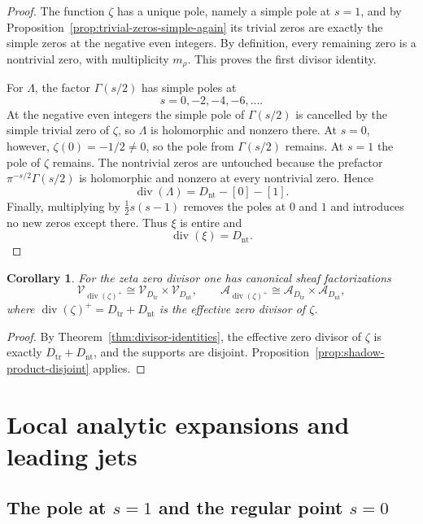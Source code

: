 \documentclass[11pt,a4paper]{article}
\newtheorem{corollary}[theorem]{Corollary}
\theoremstyle{definition}
\theoremstyle{remark}
\newcommand{\cV}{\mathcal V}
\newcommand{\cA}{\mathcal A}
\newcommand{\divv}{\operatorname{div}}
\begin{document}
\begin{proof}
The function $\zeta$ has a unique pole, namely a simple pole at $s=1$, and by Proposition~\ref{prop:trivial-zeros-simple-again} its trivial zeros are exactly the simple zeros at the negative even integers.  By definition, every remaining zero is a nontrivial zero, with multiplicity $m_\rho$.  This proves the first divisor identity.

For $\Lambda$, the factor $\Gamma(s/2)$ has simple poles at
\[
s=0,-2,-4,-6,\dots.
\]
At the negative even integers the simple pole of $\Gamma(s/2)$ is cancelled by the simple trivial zero of $\zeta$, so $\Lambda$ is holomorphic and nonzero there.  At $s=0$, however, $\zeta(0)=-1/2\neq 0$, so the pole from $\Gamma(s/2)$ remains.  At $s=1$ the pole of $\zeta$ remains.  The nontrivial zeros are untouched because the prefactor $\pi^{-s/2}\Gamma(s/2)$ is holomorphic and nonzero at every nontrivial zero.  Hence
\[
\divv(\Lambda)=D_{\mathrm{nt}}-[0]-[1].
\]
Finally, multiplying by $\frac12 s(s-1)$ removes the poles at $0$ and $1$ and introduces no new zeros except there.  Thus $\xi$ is entire and
\[
\divv(\xi)=D_{\mathrm{nt}}.
\]
\end{proof}

\begin{corollary}\label{cor:shadow-zeta-splits}
For the zeta zero divisor one has canonical sheaf factorizations
\[
\cV_{\divv(\zeta)^+}\cong \cV_{D_{\mathrm{tr}}}\times \cV_{D_{\mathrm{nt}}},
\qquad
\cA_{\divv(\zeta)^+}\cong \cA_{D_{\mathrm{tr}}}\times \cA_{D_{\mathrm{nt}}},
\]
where $\divv(\zeta)^+=D_{\mathrm{tr}}+D_{\mathrm{nt}}$ is the effective zero divisor of $\zeta$.
\end{corollary}

\begin{proof}
By Theorem~\ref{thm:divisor-identities}, the effective zero divisor of $\zeta$ is exactly $D_{\mathrm{tr}}+D_{\mathrm{nt}}$, and the supports are disjoint.  Proposition~\ref{prop:shadow-product-disjoint} applies.
\end{proof}

\section{Local analytic expansions and leading jets}

\subsection{The pole at $s=1$ and the regular point $s=0$}
\end{document}
